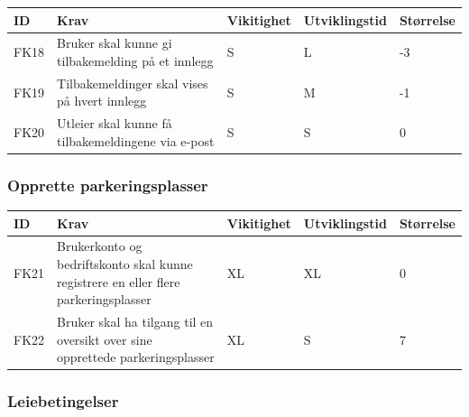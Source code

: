 \documentclass[12pt]{article}
\newcommand{\cellr}{\cellcolor{red!25}}
\newcommand{\cello}{\cellcolor{orange!25}}
\newcommand{\cellg}{\cellcolor{green!25}}
\begin{document}
        \begin{tabular}{|p{2cm}|p{6cm}|
            >{\centering\arraybackslash}p{2cm}|
            >{\centering\arraybackslash}p{2cm}|
            >{\centering\arraybackslash}p{2cm}|} 
            \hline
            \bf ID & \bf Krav & \bf Vikitighet & \bf Utviklingstid & \bf Størrelse\\
            \hline
            FK18
            &
            Bruker skal kunne gi tilbakemelding på et innlegg
            & S & L & \cellr -3\\
            \hline
            FK19
            &
            Tilbakemeldinger skal vises på hvert innlegg
            & S & M & \cello -1\\
            \hline
            FK20
            &
            Utleier skal kunne få tilbakemeldingene via e-post
            & S & S & \cellg 0\\
            \hline
        \end{tabular}
        
        \subsubsection{Opprette parkeringsplasser}

        \begin{tabular}{|p{2cm}|p{6cm}|
            >{\centering\arraybackslash}p{2cm}|
            >{\centering\arraybackslash}p{2cm}|
            >{\centering\arraybackslash}p{2cm}|} 
            \hline
            \bf ID & \bf Krav & \bf Vikitighet & \bf Utviklingstid & \bf Størrelse\\
            \hline
            FK21
            &
            Brukerkonto og bedriftskonto skal kunne registrere en eller flere parkeringsplasser
            & XL & XL & \cellg 0\\
            \hline
            FK22
            &
            Bruker skal ha tilgang til en oversikt over sine opprettede parkeringsplasser
            & XL & S & \cellg 7 \\
            \hline
        \end{tabular}

        \subsubsection{Leiebetingelser}
        
\end{document}
